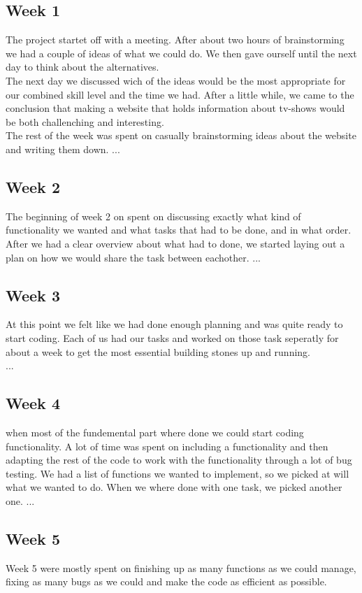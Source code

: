 

\subsection{Week 1}
The project startet off with a meeting. After about two hours of brainstorming we had a couple of ideas of what we could do. We then gave ourself until the next day to think about the alternatives. \\
The next day we discussed wich of the ideas would be the most appropriate for our combined skill level and the time we had. After a little while, we came to the conclusion that making a website that holds information about tv-shows would be both challenching and interesting.\\

The rest of the week was spent on casually brainstorming ideas about the website and writing them down.
...
\subsection{Week 2}

The beginning of week 2 on spent on discussing exactly what kind of functionality we wanted and what tasks that had to be done, and in what order.
After we had a clear overview about what had to done, we started laying out a plan on how we would share the task between eachother.
...
\subsection{Week 3}
At this point we felt like we had done enough planning and was quite ready to start coding. Each of us had our tasks and worked on those task seperatly for about a week to get the most essential building stones up and running.\\
...
\subsection{Week 4}
when most of the fundemental part where done we could start coding functionality. A lot of time was spent on including a functionality and then adapting the rest of the code to work with the functionality through a lot of bug testing. We had a list of functions we wanted to implement, so we picked at will what we wanted to do. When we where done with one task, we picked another one.
...
\subsection{Week 5}
Week 5 were mostly spent on finishing up as many functions as we could manage, fixing as many bugs as we could and make the code as efficient as possible.\\

